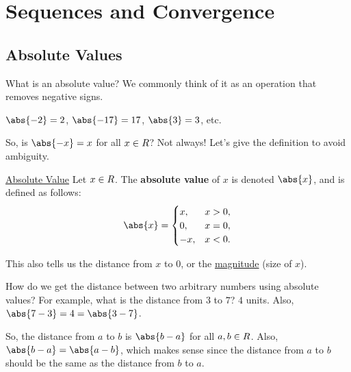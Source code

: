 \chapter{Sequences and Convergence}
\section{Absolute Values}
What is an absolute value? We commonly think of it as an operation that removes negative signs.
\begin{Example}{}{}
    $ \abs{-2}=2 $, $ \abs{-17}=17 $, $ \abs{3}=3 $, etc.
\end{Example}
So, is $ \abs{-x}=x $ for all $ x\in\relax{R}$? Not always! Let's give the definition to avoid ambiguity.
\begin{Definition}{\href{https://proofwiki.org/wiki/Definition:Absolute_Value/Definition_1}{Absolute Value}}{}
    Let $ x\in\relax{R} $. The \textbf{absolute value} of $ x $ is denoted $ \abs{x} $,
    and is defined as follows:
    \[ \abs{x}=\begin{cases}
            x,  & x>0, \\
            0,  & x=0, \\
            -x, & x<0.
        \end{cases} \]
\end{Definition}
This also tells us the distance from $ x $ to $ 0 $, or the \underline{magnitude} (size of $ x $).
\begin{Example}{}{}
    How do we get the distance between two arbitrary numbers using absolute values? For example, what is
    the distance from $ 3 $ to $ 7 $? $ 4 $ units. Also, $ \abs{7-3}=4=\abs{3-7} $.
\end{Example}
So, the distance from $ a $ to $ b $ is $ \abs{b-a} $ for all $ a,b\in\relax{R} $. Also,
$ \abs{b-a}=\abs{a-b} $, which makes sense since the distance from $ a $ to $ b $ should be the same as
the distance from $ b $ to $ a $.
